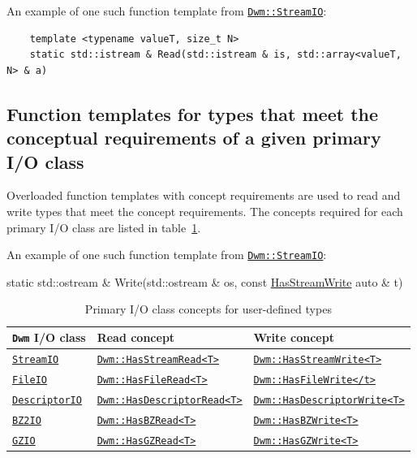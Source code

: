An example of one such function template from
\hyperref[section:DwmStreamIOClass]{\texttt{Dwm::StreamIO}}:

\begin{verbatim}
    template <typename valueT, size_t N>
    static std::istream & Read(std::istream & is, std::array<valueT, N> & a)
\end{verbatim}

\subsection{Function templates for types that meet the conceptual requirements of a given primary I/O class}
Overloaded function templates with concept requirements are used to read
and write types that meet the concept requirements.  The concepts required
for each primary I/O class are listed in
table~\ref{table:PrimaryIOClassConcepts}.

An example of one such function template from
\hyperref[section:DwmStreamIOClass]{\texttt{Dwm::StreamIO}}:

\begin{ttfamily}
  static std::ostream \& Write(std::ostream \& os, const \hyperlink{concept:HasStreamWrite}{HasStreamWrite} auto \& t)
\end{ttfamily}

\begin{table}[H]
\begin{tabular}{lll}
  \textbf{\texttt{Dwm} I/O class} & \textbf{Read concept} & \textbf{Write concept} \\ \hline
  \hyperref[section:DwmStreamIOClass]{\texttt{StreamIO}} & \hyperlink{concept:HasStreamRead}{\texttt{Dwm::HasStreamRead<T>}} & \hyperlink{concept:HasStreamWrite}{\texttt{Dwm::HasStreamWrite<T>}} \\
  \hyperref[section:DwmFileIOClass]{\texttt{FileIO}} & \hyperlink{concept:HasFileRead}{\texttt{Dwm::HasFileRead<T>}} & \hyperlink{concept:HasFileWrite}{\texttt{Dwm::HasFileWrite</t>}} \\
  \hyperref[section:DwmDescriptorIOClass]{\texttt{DescriptorIO}} & \hyperlink{concept:HasDescriptorRead}{\texttt{Dwm::HasDescriptorRead<T>}} & \hyperlink{concept:HasDescriptorWrite}{\texttt{Dwm::HasDescriptorWrite<T>}} \\
  \hyperref[section:DwmBZ2IOClass]{\texttt{BZ2IO}} & \hyperlink{concept:HasBZRead}{\texttt{Dwm::HasBZRead<T>}} & \hyperlink{concept:HasBZWrite}{\texttt{Dwm::HasBZWrite<T>}} \\
  \hyperref[section:DwmGZIOClass]{\texttt{GZIO}} & \hyperlink{concept:DwmHasGZRead}{\texttt{Dwm::HasGZRead<T>}} & \hyperlink{concept:DwmHasGZWrite}{\texttt{Dwm::HasGZWrite<T>}} \\
\end{tabular}
\caption{Primary I/O class concepts for user-defined types}
\label{table:PrimaryIOClassConcepts}
\end{table}

